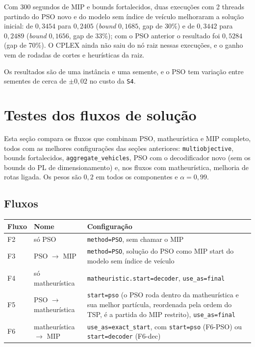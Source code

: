 \documentclass[11pt,a4paper]{article}
\begin{document}
Com 300 segundos de MIP e bounds fortalecidos, duas execuções com 2 threads
partindo do PSO novo e do modelo sem índice de veículo melhoraram a solução
inicial: de $0{,}3454$ para $0{,}2405$ (\emph{bound} $0{,}1685$, gap de 30\%) e
de $0{,}3442$ para $0{,}2489$ (\emph{bound} $0{,}1656$, gap de 33\%); com o PSO
anterior o resultado foi $0{,}5284$ (gap de 70\%). O CPLEX ainda não saiu do nó
raiz nessas execuções, e o ganho vem de rodadas de cortes e heurísticas da
raiz.

Os resultados são de uma instância e uma semente, e o PSO tem variação
entre sementes de cerca de $\pm0{,}02$ no custo da \texttt{S4}.

\section{Testes dos fluxos de solução}
\label{sec:flows}

Esta seção compara os fluxos que combinam PSO, matheurística e MIP completo,
todos com as melhores configurações das seções anteriores:
\texttt{multiobjective}, bounds fortalecidos, \texttt{aggregate\_vehicles},
PSO com o decodificador novo (sem os bounds do PL de dimensionamento) e, nos
fluxos com matheurística, melhoria de rotas ligada. Os pesos são $0{,}2$ em
todos os componentes e $\alpha=0{,}99$.

\subsection{Fluxos}

\begin{center}
\small
\begin{tabular}{llp{7.2cm}}
\toprule
Fluxo & Nome & Configuração \\
\midrule
F2 & só PSO & \texttt{method=PSO}, sem chamar o MIP \\
F3 & PSO $\to$ MIP & \texttt{method=PSO}, solução do PSO como MIP start do modelo sem índice de veículo \\
F4 & só matheurística & \texttt{matheuristic.start=decoder}, \texttt{use\_as=final} \\
F5 & PSO $\to$ matheurística & \texttt{start=pso} (o PSO roda dentro da matheurística e sua melhor partícula, reordenada pela ordem do TSP, é a partida do MIP restrito), \texttt{use\_as=final} \\
F6 & matheurística $\to$ MIP & \texttt{use\_as=exact\_start}, com \texttt{start=pso} (F6-PSO) ou \texttt{start=decoder} (F6-dec) \\
\bottomrule
\end{tabular}
\end{center}
\end{document}
